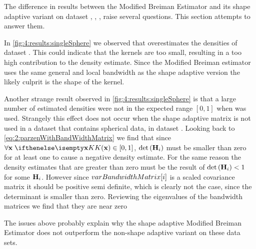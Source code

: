 
The difference in results between the Modified Breiman Estimator and its shape adaptive variant on dataset \ferdosiOne, \baakmanOne, \baakmanFour, \baakmanFive raise several questions. This section attempts to answer them.

	In \cref{fig:4:results:singleSphere} we observed that \sambe overestimates the densities of dataset \ferdosiOne. This could indicate that the kernels are too small, resulting in a too high contribution to the density estimate. Since the Modified Breiman estimator uses the same general and local bandwidth as the shape adaptive version the likely culprit is the shape of the kernel.

Another strange result observed in \cref{fig:4:results:singleSphere} is that a large number of estimated densities were not in the expected range $[0, 1]$ when \sambe was used. Strangely this effect does not occur when the shape adaptive matrix is not used in a dataset that contains spherical data, \ie in dataset \ferdosiOne. Looking back to \cref{eq:2:parzenWithBandWidthMatrix} we find that since $\forall \varPattern\; \varKernel{\varPattern} \in[0, 1]$, $\det\left(\varBandwidthMatrix[\itXis]\right)$ must be smaller than zero for at least one \varPattern[\itXis] to cause a negative density estimate. For the same reason the density estimates that are greater than zero must be the result of $\det\left(\varBandwidthMatrix[\itXis]\right) < 1$ for some $\varBandwidthMatrix[\itXis]$. However since $varBandwidthMatrix[i]$ is a scaled covariance matrix it should be positive semi definite, which is clearly not the case, since the determinant is smaller than zero. Reviewing the eigenvalues of the bandwidth matrices we find that they are near zero 

The issues above probably explain why the shape adaptive Modified Breiman Estimator does not outperform the non-shape adaptive variant on these data sets.